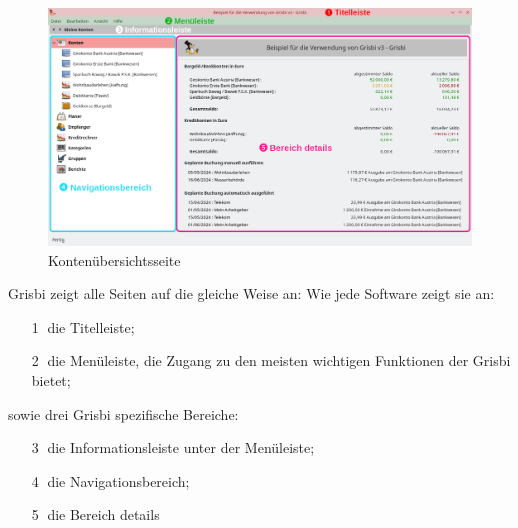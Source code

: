 
\begin{figure}[htbp]			%
	\begin{center}
		\includegraphics[width=1\textwidth]{image/screenshot/home_3.0.png}
	\end{center}
	\caption{Kontenübersichtsseite}		%
	\label{home_3.0}
\end{figure}


Grisbi zeigt alle Seiten auf die gleiche Weise an: Wie jede Software zeigt sie an:%

\begin{itemize}%
	\item[\large\textcircled{\small 1}] die Titelleiste;%
	\item[\large\textcircled{\small 2}] die Menüleiste, die Zugang zu den meisten wichtigen Funktionen der Grisbi bietet;%
\end{itemize}
sowie drei Grisbi spezifische Bereiche:%
\begin{itemize}%
	\item[\large\textcircled{\small 3}] die Informationsleiste unter der Menüleiste;%
	\item[\large\textcircled{\small 4}] die Navigationsbereich;%
	\item[\large\textcircled{\small 5}] die Bereich details%
\end{itemize}

